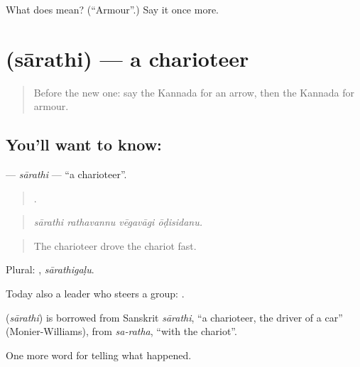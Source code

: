 \begin{tcolorbox}[breakable,colback=teal!4,colframe=teal!35!black,title={Before you move on}]
What does  mean? (\textquotedblleft{}Armour\textquotedblright{}.) Say it once more.
\end{tcolorbox}
\section[\texorpdfstring{\kn{ಸಾರಥಿ} (sārathi)}{ಸಾರಥಿ (sārathi)}]{ (sārathi) — a charioteer}

\label{lesson:KA-C349-sarathi}



\begin{quote}
Before the new one: say the Kannada for an arrow, then the Kannada for armour.
\end{quote}

\subsection*{You'll want to know: }
\textbf{} — \emph{sārathi} — \textquotedblleft{}a charioteer\textquotedblright{}.

\begin{quote}
   .
\end{quote}

\begin{quote}
\emph{sārathi rathavannu vēgavāgi ōḍisidanu.}
\end{quote}

\begin{quote}
The charioteer drove the chariot fast.
\end{quote}

Plural: , \emph{sārathigaḷu}.

Today also a leader who steers a group:  .

\begin{cousinweb}
\textbf{} (\emph{sārathi}) is borrowed from Sanskrit \emph{sārathi}, \textquotedblleft{}a charioteer, the driver of a car\textquotedblright{} (Monier-Williams), from \emph{sa-ratha}, \textquotedblleft{}with the chariot\textquotedblright{}.
\end{cousinweb}

\begin{grammarlens}[title={What you've built}]
One more word for telling what happened.
\end{grammarlens}

